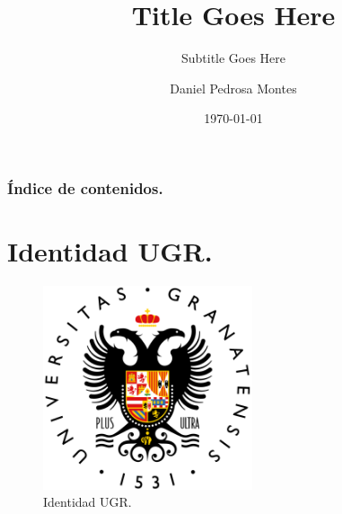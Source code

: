 \documentclass{beamer}
\title{Title Goes Here}
\subtitle{Subtitle Goes Here}
\author{Daniel Pedrosa Montes}
\institute{Universidad de Granada}
\date{\today}
\begin{document}
	\begin{frame}
		\titlepage
	\end{frame}

	\begin{frame}
		\frametitle{Índice de contenidos.}
		\tableofcontents
	\end{frame}

	\section{Identidad UGR.}
	\begin{frame}{\secname}
		\begin{figure}[ht]
			\centering
			\includegraphics[height=6cm,keepaspectratio]{ugr.png}
			\caption{Identidad UGR.}
		\end{figure}
	\end{frame}
\end{document}
